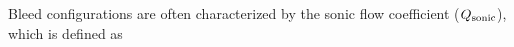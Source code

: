 \documentclass{article}
\begin{document}
Bleed configurations are often characterized by the sonic flow coefficient ($Q_{\textrm{sonic}}$), which is defined as

%

\ifdraft
  \printbibliography
\fi
\end{document}
